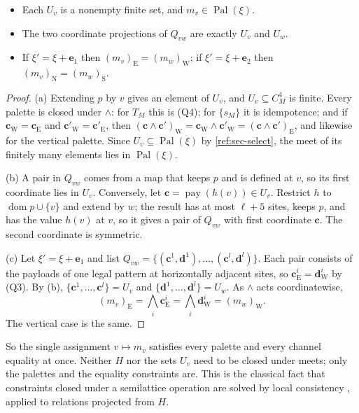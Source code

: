 \begin{lemma}\label{ref:meet}
\begin{itemize}
\item[(a)] Each $U_v$ is a nonempty finite set, and $m_v\in\operatorname{Pal}(\xi)$.
\item[(b)] The two coordinate projections of $Q_{vw}$ are exactly $U_v$ and $U_w$.
\item[(c)] If $\xi'=\xi+\mathbf e_1$ then $(m_v)_{\mathrm E}=(m_w)_{\mathrm W}$; if $\xi'=\xi+\mathbf e_2$ then $(m_v)_{\mathrm N}=(m_w)_{\mathrm S}$.
\end{itemize}
\end{lemma}

\begin{proof}
(a) Extending $p$ by $v$ gives an element of $U_v$, and $U_v\subseteq C_M^4$ is finite. Every palette is closed under $\wedge$: for $T_M$ this is (Q4); for $\{s_M\}$ it is idempotence; and if $\mathbf c_{\mathrm W}=\mathbf c_{\mathrm E}$ and $\mathbf c'_{\mathrm W}=\mathbf c'_{\mathrm E}$, then $(\mathbf c\wedge\mathbf c')_{\mathrm W}=\mathbf c_{\mathrm W}\wedge\mathbf c'_{\mathrm W}=(\mathbf c\wedge\mathbf c')_{\mathrm E}$, and likewise for the vertical palette. Since $U_v\subseteq\operatorname{Pal}(\xi)$ by \cref{ref:sec-select}, the meet of its finitely many elements lies in $\operatorname{Pal}(\xi)$.

(b) A pair in $Q_{vw}$ comes from a map that keeps $p$ and is defined at $v$, so its first coordinate lies in $U_v$. Conversely, let $\mathbf c=\operatorname{pay}(h(v))\in U_v$. Restrict $h$ to $\operatorname{dom}p\cup\{v\}$ and extend by $w$; the result has at most $\ell+5$ sites, keeps $p$, and has the value $h(v)$ at $v$, so it gives a pair of $Q_{vw}$ with first coordinate $\mathbf c$. The second coordinate is symmetric.

(c) Let $\xi'=\xi+\mathbf e_1$ and list $Q_{vw}=\{(\mathbf c^1,\mathbf d^1),\dots,(\mathbf c^l,\mathbf d^l)\}$. Each pair consists of the payloads of one legal pattern at horizontally adjacent sites, so $\mathbf c^i_{\mathrm E}=\mathbf d^i_{\mathrm W}$ by (Q3). By (b), $\{\mathbf c^1,\dots,\mathbf c^l\}=U_v$ and $\{\mathbf d^1,\dots,\mathbf d^l\}=U_w$. As $\wedge$ acts coordinatewise,
\[
(m_v)_{\mathrm E}=\textstyle\bigwedge_i\mathbf c^i_{\mathrm E}=\bigwedge_i\mathbf d^i_{\mathrm W}=(m_w)_{\mathrm W}.
\]
The vertical case is the same.
\end{proof}

So the single assignment $v\mapsto m_v$ satisfies every palette and every channel equality at once. Neither $H$ nor the sets $U_v$ need to be closed under meets; only the palettes and the equality constraints are. This is the classical fact that constraints closed under a semilattice operation are solved by local consistency \cite{JCG97}, applied to relations projected from $H$.

